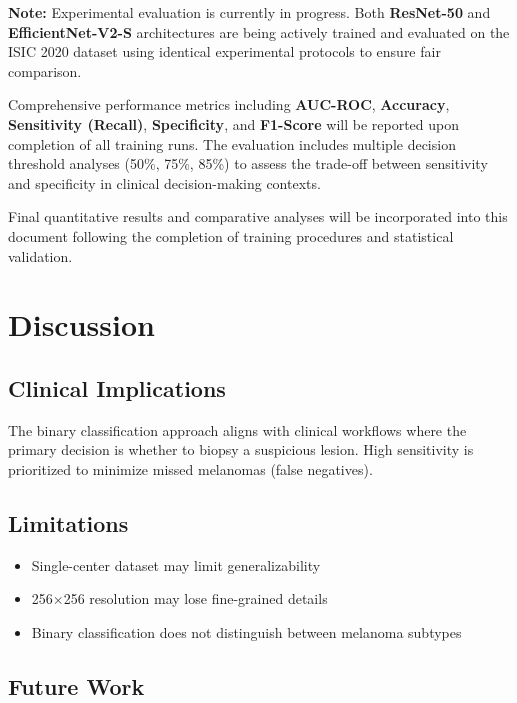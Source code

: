 \documentclass[12pt,a4paper]{article}
\begin{document}
\textbf{Note:} Experimental evaluation is currently in progress. Both \textbf{ResNet-50} and \textbf{EfficientNet-V2-S} architectures are being actively trained and evaluated on the ISIC 2020 dataset using identical experimental protocols to ensure fair comparison.

Comprehensive performance metrics including \textbf{AUC-ROC}, \textbf{Accuracy}, \textbf{Sensitivity (Recall)}, \textbf{Specificity}, and \textbf{F1-Score} will be reported upon completion of all training runs. The evaluation includes multiple decision threshold analyses (50\%, 75\%, 85\%) to assess the trade-off between sensitivity and specificity in clinical decision-making contexts.

Final quantitative results and comparative analyses will be incorporated into this document following the completion of training procedures and statistical validation.

\section{Discussion}
\label{sec:discussion}

\subsection{Clinical Implications}

The binary classification approach aligns with clinical workflows where the primary decision is whether to biopsy a suspicious lesion. High sensitivity is prioritized to minimize missed melanomas (false negatives).

\subsection{Limitations}

\begin{itemize}
    \item Single-center dataset may limit generalizability
    \item 256$\times$256 resolution may lose fine-grained details
    \item Binary classification does not distinguish between melanoma subtypes
\end{itemize}

\subsection{Future Work}
\end{document}
